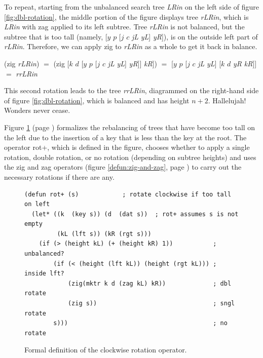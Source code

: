 To repeat, starting from the unbalanced search tree \emph{LRin}
on the left side of figure \ref{fig:dbl-rotation},
the middle portion of the figure displays tree \emph{rLRin},
which is \emph{LRin} with \textsf{zag} applied to its left subtree.
Tree \emph{rLRin}
is not balanced, but the subtree that is too tall
(namely, \textsf{[$y$ $p$ [$j$ $c$} \emph{jL} \emph{yL}\textsf{]} \emph{yR}\textsf{]}),
is on the outside left part of \emph{rLRin}.
Therefore, we can apply \textsf{zig} to \emph{rLRin} as a whole
to get it back in balance.
\begin{center}
\textsf{(zig} \emph{rLRin}\textsf{)} $=$
\textsf{(zig [$k$ $d$ [$y$ $p$ [$j$ $c$} \emph{jL} \emph{yL}\textsf{]} \emph{yR}\textsf{]]} \emph{kR}\textsf{])} $=$
\textsf{[$y$ $p$ [$j$ $c$} \emph{jL} \emph{yL}\textsf{] [$k$ $d$} \emph{yR} \emph{kR}\textsf{]]}
$=$ \emph{rrLRin}
\end{center}
This second rotation leads to
the tree \emph{rrLRin},
diagrammed on the right-hand side of
figure \ref{fig:dbl-rotation},
which is balanced and has height $n+2$.
Hallelujah! Wonders never cease.

Figure \ref{defun:rot+} (page \pageref{defun:rot+})
formalizes the rebalancing of trees
that have become too tall on the left due to the
insertion of a key that is less than the key at the root.
The operator \textsf{rot}+, which is defined in the figure,
chooses whether to apply a single rotation,
double rotation, or no rotation
(depending on subtree heights)
and uses the \textsf{zig} and \textsf{zag} operators
(figure \ref{defun:zig-and-zag}, page \pageref{defun:zig-and-zag})
to carry out the necessary rotations if there are any.

\begin{figure}
\begin{center}
\begin{code}
\begin{verbatim}
(defun rot+ (s)            ; rotate clockwise if too tall on left
  (let* ((k  (key s)) (d  (dat s))  ; rot+ assumes s is not empty
         (kL (lft s)) (kR (rgt s)))
    (if (> (height kL) (+ (height kR) 1))           ; unbalanced?
        (if (< (height (lft kL)) (height (rgt kL))) ; inside lft?
            (zig(mktr k d (zag kL) kR))             ; dbl rotate
            (zig s))                                ; sngl rotate
        s)))                                        ; no rotate
\end{verbatim}
\end{code}
\end{center}
\caption{Formal definition of the clockwise rotation operator.}
\label{defun:rot+}
\end{figure}

